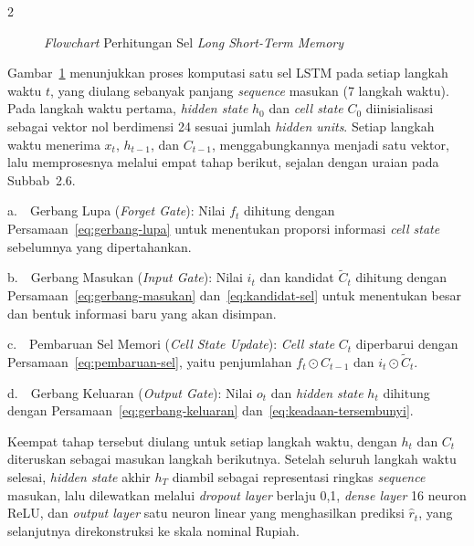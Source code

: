 \documentclass[12pt, a4paper, onecolumn, oneside]{report}
\begin{document}
\begin{spacing}{2}
\begin{figure}[H]
{%
    }
    \caption{\textit{Flowchart} Perhitungan Sel \textit{Long Short-Term Memory}}
    \label{fig:sel_lstm}
\end{figure}

Gambar~\ref{fig:sel_lstm} menunjukkan proses komputasi satu sel LSTM pada setiap langkah waktu $t$, yang diulang sebanyak panjang \textit{sequence} masukan (7 langkah waktu). Pada langkah waktu pertama, \textit{hidden state} $h_0$ dan \textit{cell state} $C_0$ diinisialisasi sebagai vektor nol berdimensi 24 sesuai jumlah \textit{hidden units}. Setiap langkah waktu menerima $x_t$, $h_{t-1}$, dan $C_{t-1}$, menggabungkannya menjadi satu vektor, lalu memprosesnya melalui empat tahap berikut, sejalan dengan uraian pada Subbab~2.6.

\noindent a.~~Gerbang Lupa (\textit{Forget Gate}): Nilai $f_t$ dihitung dengan Persamaan~\ref{eq:gerbang-lupa} untuk menentukan proporsi informasi \textit{cell state} sebelumnya yang dipertahankan.

\noindent b.~~Gerbang Masukan (\textit{Input Gate}): Nilai $i_t$ dan kandidat $\tilde{C}_t$ dihitung dengan Persamaan~\ref{eq:gerbang-masukan} dan~\ref{eq:kandidat-sel} untuk menentukan besar dan bentuk informasi baru yang akan disimpan.

\noindent c.~~Pembaruan Sel Memori (\textit{Cell State Update}): \textit{Cell state} $C_t$ diperbarui dengan Persamaan~\ref{eq:pembaruan-sel}, yaitu penjumlahan $f_t \odot C_{t-1}$ dan $i_t \odot \tilde{C}_t$.

\noindent d.~~Gerbang Keluaran (\textit{Output Gate}): Nilai $o_t$ dan \textit{hidden state} $h_t$ dihitung dengan Persamaan~\ref{eq:gerbang-keluaran} dan~\ref{eq:keadaan-tersembunyi}.

Keempat tahap tersebut diulang untuk setiap langkah waktu, dengan $h_t$ dan $C_t$ diteruskan sebagai masukan langkah berikutnya. Setelah seluruh langkah waktu selesai, \textit{hidden state} akhir $h_T$ diambil sebagai representasi ringkas \textit{sequence} masukan, lalu dilewatkan melalui \textit{dropout layer} berlaju 0,1, \textit{dense layer} 16 neuron ReLU, dan \textit{output layer} satu neuron linear yang menghasilkan prediksi $\hat{r}_t$, yang selanjutnya direkonstruksi ke skala nominal Rupiah.


\end{spacing}
\end{document}
